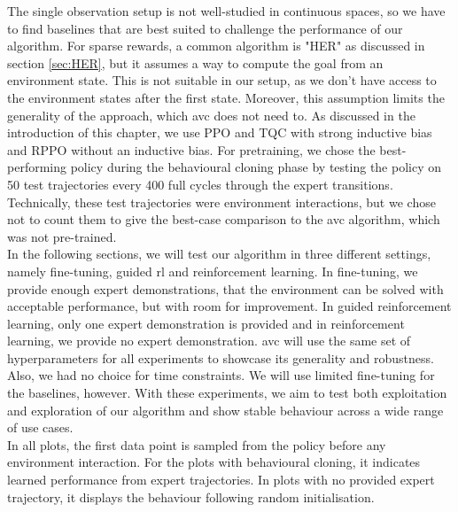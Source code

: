The single observation setup is not well-studied in continuous spaces, so we have to find baselines that are best suited to challenge the performance of our algorithm. For sparse rewards, a common
algorithm is "HER" as discussed in section \ref{sec:HER}, but it assumes a way to compute the goal from an environment state. This is not suitable in our setup, as we don't have access to the environment
states after the first state. Moreover, this assumption limits the generality of the approach, which \ac{avc} does not need to.
As discussed in the introduction of this chapter, we use PPO and TQC with strong inductive bias and RPPO without an inductive bias. 
For pretraining, we chose the best-performing policy during the behavioural cloning phase by testing the policy on 50 test 
trajectories every 400 full cycles through the 
expert transitions. Technically, these test trajectories were environment interactions, but we chose not to count them to give the best-case comparison to the \ac{avc} algorithm, which was not pre-trained.\\

In the following sections, we will test our algorithm in three different settings, namely fine-tuning, guided \ac{rl} and reinforcement learning. In fine-tuning, we provide
enough expert demonstrations, that the environment can be solved with acceptable performance, but with room for improvement. In guided reinforcement learning,
only one expert demonstration is provided and in reinforcement learning, we provide no expert demonstration. \ac{avc} will use the same set of hyperparameters for all experiments to showcase its generality and robustness. Also, we had no choice for time constraints.
We will use limited fine-tuning for the baselines, however.
With these experiments, we aim to test both exploitation and exploration of our algorithm and show stable
behaviour across a wide range of use cases. \\

In all plots, the first data point is sampled from the policy before any environment interaction. For the plots with behavioural cloning, it indicates learned performance from expert trajectories.
In plots with no provided expert trajectory, it displays the behaviour following random initialisation.

